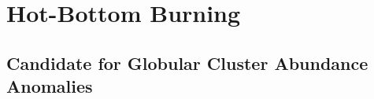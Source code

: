 \section{Hot-Bottom Burning} \label{sec:hot-bottom-burning}


\subsection{Candidate for Globular Cluster Abundance Anomalies} \label{subsec:GC_Candidate}


